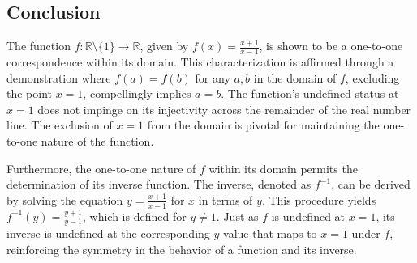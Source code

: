 \documentclass[12pt]{article}
\begin{document}
\subsection*{Conclusion}
The function \( f: \mathbb{R} \setminus \{1\} \to \mathbb{R} \), given by \( f(x) = \frac{x + 1}{x - 1} \), is shown to be a one-to-one correspondence within its domain. This characterization is affirmed through a demonstration where \( f(a) = f(b) \) for any \( a, b \) in the domain of \( f \), excluding the point \( x = 1 \), compellingly implies \( a = b \). The function's undefined status at \( x = 1 \) does not impinge on its injectivity across the remainder of the real number line. The exclusion of \( x = 1 \) from the domain is pivotal for maintaining the one-to-one nature of the function.

Furthermore, the one-to-one nature of \( f \) within its domain permits the determination of its inverse function. The inverse, denoted as \( f^{-1} \), can be derived by solving the equation \( y = \frac{x + 1}{x - 1} \) for \( x \) in terms of \( y \). This procedure yields \( f^{-1}(y) = \frac{y + 1}{y - 1} \), which is defined for \( y \neq 1 \). Just as \( f \) is undefined at \( x = 1 \), its inverse is undefined at the corresponding \( y \) value that maps to \( x = 1 \) under \( f \), reinforcing the symmetry in the behavior of a function and its inverse.
\end{document}
